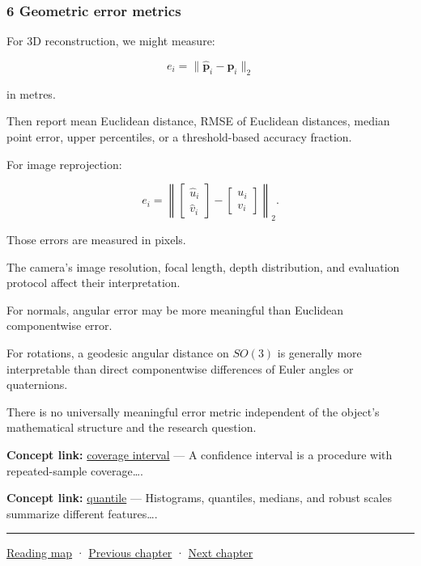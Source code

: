 \subsubsection{6 Geometric error metrics}\label{02-foundations-ii-ch030-geometric-error-metrics}

For 3D reconstruction, we might measure:

\[
 e_i=\|\hat{\mathbf p}_i-\mathbf p_i\|_2
\]

in metres.

Then report mean Euclidean distance, RMSE of Euclidean distances, median point error, upper percentiles, or a threshold-based accuracy fraction.

For image reprojection:

\[
 e_i= \left\| \begin{bmatrix}\hat u_i\\\hat v_i\end{bmatrix} - \begin{bmatrix}u_i\\v_i\end{bmatrix} \right\|_2.
\]

Those errors are measured in pixels.

The camera's image resolution, focal length, depth distribution, and evaluation protocol affect their interpretation.

For normals, angular error may be more meaningful than Euclidean componentwise error.

For rotations, a geodesic angular distance on \(SO(3)\) is generally more interpretable than direct componentwise differences of Euler angles or quaternions.

There is no universally meaningful error metric independent of the object's mathematical structure and the research question.

\textbf{Concept link:} \hyperref[02-foundations-ii-ch030-inference-and-error-metrics-need-explicit-assumptions]{coverage interval} --- A confidence interval is a procedure with repeated-sample coverage\ldots.

\textbf{Concept link:} \hyperref[02-foundations-ii-ch030-inference-and-error-metrics-need-explicit-assumptions]{quantile} --- Histograms, quantiles, medians, and robust scales summarize different features\ldots.

\begin{center}\rule{0.5\linewidth}{0.5pt}\end{center}

\hyperref[volume-reading-map]{Reading map} · \hyperref[02-foundations-ii-ch029-discretization-convergence-and-experimental-design]{Previous chapter} · \hyperref[02-foundations-ii-ch031-implement-probability-with-numerical-contracts]{Next chapter}

